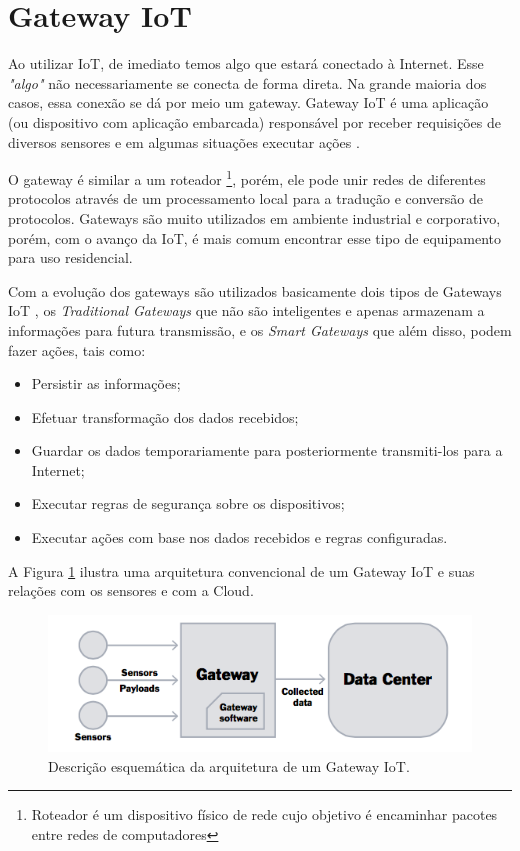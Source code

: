 \section{Gateway IoT}
\label{sec:iotGateway}

Ao utilizar IoT, de imediato temos algo que estará conectado à Internet. Esse \textit{"algo"} não necessariamente se conecta de forma direta. Na grande maioria dos casos, essa conexão se dá por meio um gateway. Gateway IoT é uma aplicação (ou dispositivo com aplicação embarcada) responsável por receber requisições de diversos sensores e em algumas situações executar ações \cite{ChenJiaLi}. 

O gateway é similar a um roteador \footnote{Roteador é um dispositivo físico de rede cujo objetivo é encaminhar pacotes entre redes de computadores}, porém, ele pode unir redes de diferentes protocolos através de um processamento local para a tradução e conversão de protocolos. Gateways são muito utilizados em ambiente industrial e corporativo, porém, com o avanço da IoT, é mais comum encontrar esse tipo de equipamento para uso residencial.

Com a evolução dos gateways são utilizados basicamente dois tipos de Gateways IoT \cite{WhatIsIotGateway}, os \textit{Traditional Gateways} que não são inteligentes e apenas armazenam a informações para futura transmissão, e os \textit{Smart Gateways} que além disso, podem fazer ações, tais como:
\begin{itemize}
	\item Persistir as informações;
	\item Efetuar transformação dos dados recebidos;
	\item Guardar os dados temporariamente para posteriormente transmiti-los para a Internet;
	\item Executar regras de segurança sobre os dispositivos;
	\item Executar ações com base nos dados recebidos e regras configuradas.
\end{itemize}

A Figura \ref{fig:arquiteturaIotGateway} ilustra uma arquitetura convencional de um Gateway IoT e suas relações com os sensores e com a Cloud.
\begin{figure}[h!]
	\begin{center}
		\includegraphics[width=1\textwidth]{./img/rumFxS7.png}
		\caption{Descrição esquemática da arquitetura de um Gateway IoT. \cite{DZone}}
		\label{fig:arquiteturaIotGateway}
	\end{center}
\end{figure}

